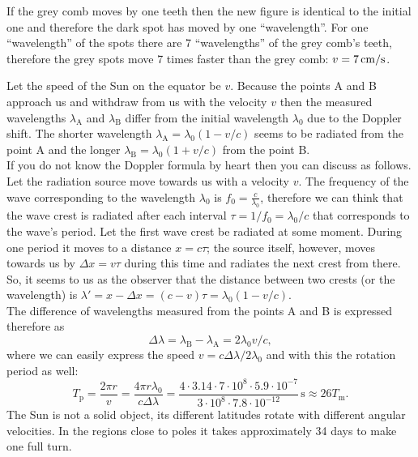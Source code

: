 \documentclass[11pt]{article}
\begin{document}
\solueng
If the grey comb moves by one teeth then the new figure is identical to the initial one and therefore the dark spot has moved by one “wavelength”. For one “wavelength” of the spots there are 7 “wavelengths” of the grey comb’s teeth, therefore the grey spots move 7 times faster than the grey comb: $v=\SI 7{cm/s}$.
\probend
\bigskip


\solueng
Let the speed of the Sun on the equator be $v$. Because the points A and B approach us and withdraw from us with the velocity $v$ then the measured wavelengths $\lambda_\text{A}$ and $\lambda_\text{B}$ differ from the initial wavelength $\lambda_0$ due to the Doppler shift. The shorter wavelength $\lambda_\text{A}=\lambda_0(1-v/c)$ seems to be radiated from the point A and the longer $\lambda_\text{B}=\lambda_0(1+v/c)$ from the point B.\\
If you do not know the Doppler formula by heart then you can discuss as follows. Let the radiation source move towards us with a velocity $v$. The frequency of the wave corresponding to the wavelength $\lambda_0$ is $f_0=\frac{c}{\lambda_0}$, therefore we can think that the wave crest is radiated after each interval $\tau = 1/f_0 = \lambda_0/c$ that corresponds to the wave’s period. Let the first wave crest be radiated at some moment. During one period it moves to a distance $x=c\tau$; the source itself, however, moves towards us by $\Delta x = v\tau$ during this time and radiates the next crest from there. So, it seems to us as the observer that the distance between two crests (or the wavelength) is $\lambda'=x-\Delta x=(c-v)\tau = \lambda_0(1-v/c)$.\\
The difference of wavelengths measured from the points A and B is expressed therefore as
\[
\Delta\lambda = \lambda_\text{B}-\lambda_\text{A} = 2\lambda_0 v/c,
\]
where we can easily express the speed $v=c\Delta\lambda/2\lambda_0$ and with this the rotation period as well:
\[
T_\text{p}=\frac{2\pi r}{v}=\frac{4 \pi r \lambda_0}{c\Delta \lambda}=
\frac{4 \cdot 3.14 \cdot 7\cdot 10^8 \cdot 5.9 \cdot 10^{-7}}{3\cdot 10^8\cdot 7.8\cdot 10^{-12}}\,\text{s}\approx 26T_\mathrm{m}.
\]
The Sun is not a solid object, its different latitudes rotate with different angular velocities. In the regions close to poles it takes approximately 34 days to make one full turn.
\probend
\bigskip
\end{document}
